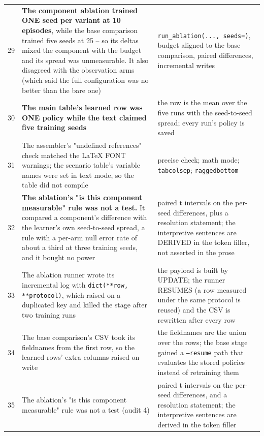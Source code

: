 \documentclass[11pt,a4paper]{article}
\begin{document}
\begin{longtable}{@{}>{\raggedleft\arraybackslash}p{0.7cm}>{\raggedright\arraybackslash}p{6.1cm}>{\raggedright\arraybackslash}p{8.55cm}@{}}
\textcolor{uavmuted}{29} & \textbf{The component ablation trained ONE seed per variant at 10 episodes}, while the base comparison trained five seeds at 25 -- so its deltas mixed the component with the budget and its spread was unmeasurable. It also disagreed with the observation arms (which said the full configuration was no better than the bare one) & \texttt{run\_ablation(..., seeds=)}, budget aligned to the base comparison, paired differences, incremental writes \\
\rowcolor{uavzebra}
\textcolor{uavmuted}{30} & \textbf{The main table's learned row was ONE policy while the text claimed five training seeds} & the row is the mean over the five runs with the seed-to-seed spread; every run's policy is saved \\
\textcolor{uavmuted}{31} & The assembler's "undefined references" check matched the LaTeX FONT warnings; the scenario table's variable names were set in text mode, so the table did not compile & precise check; math mode; \texttt{tabcolsep}; \texttt{raggedbottom} \\
\rowcolor{uavzebra}
\textcolor{uavmuted}{32} & \textbf{The ablation's "is this component measurable" rule was not a test.} It compared a component's difference with the learner's own seed-to-seed spread, a rule with a per-arm null error rate of about a third at three training seeds, and it bought no power & paired t intervals on the per-seed differences, plus a resolution statement; the interpretive sentences are DERIVED in the token filler, not asserted in the prose \\
\textcolor{uavmuted}{33} & The ablation runner wrote its incremental log with \texttt{dict(**row, **protocol)}, which raised on a duplicated key and killed the stage after two training runs & the payload is built by UPDATE; the runner RESUMES (a row measured under the same protocol is reused) and the CSV is rewritten after every row \\
\rowcolor{uavzebra}
\textcolor{uavmuted}{34} & The base comparison's CSV took its fieldnames from the first row, so the learned rows' extra columns raised on write & the fieldnames are the union over the rows; the base stage gained a \texttt{--resume} path that evaluates the stored policies instead of retraining them \\
\textcolor{uavmuted}{35} & The ablation's "is this component measurable" rule was not a test (audit 4) & paired t intervals on the per-seed differences, and a resolution statement; the interpretive sentences are derived in the token filler \\

\end{longtable}
\end{document}
